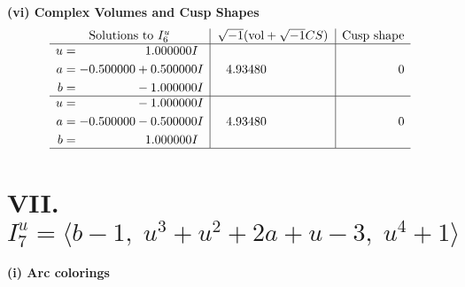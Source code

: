 \documentclass[1p]{elsarticle_modified}
\theoremstyle{definition}
\newcommand{\I}{\sqrt{-1}}
\begin{document}
\newpage\flushleft \textbf{(vi) Complex Volumes and Cusp Shapes}
$$\begin{array}{c|c|c}  
\text{Solutions to }I^u_{6}& \I (\text{vol} + \sqrt{-1}CS) & \text{Cusp shape}\\
 \hline 
\begin{aligned}
u &= \phantom{-0.000000 -}1.000000 I \\
a &= -0.500000 + 0.500000 I \\
b &= \phantom{-0.000000 } -1.000000 I\end{aligned}
 & \phantom{-}4.93480\phantom{ +0.000000I} & \phantom{-0.000000 } 0 \\ \hline\begin{aligned}
u &= \phantom{-0.000000 } -1.000000 I \\
a &= -0.500000 - 0.500000 I \\
b &= \phantom{-0.000000 -}1.000000 I\end{aligned}
 & \phantom{-}4.93480\phantom{ +0.000000I} & \phantom{-0.000000 } 0\\
 \hline 
 \end{array}$$\newpage\newpage\renewcommand{\arraystretch}{1}
\centering \section*{VII. $I^u_{7}= \langle b-1,\;u^3+u^2+2 a+u-3,\;u^4+1 \rangle$}
\flushleft \textbf{(i) Arc colorings}\\
\end{document}
